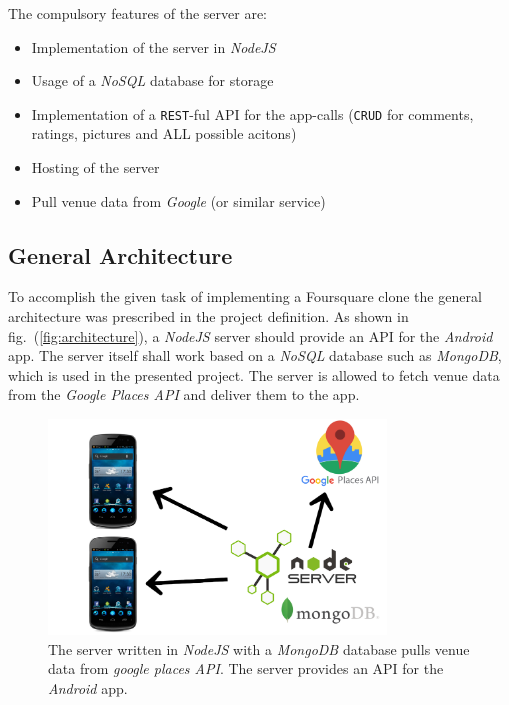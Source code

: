 The compulsory features of the server are:
\begin{itemize}
	\item Implementation of the server in \textit{NodeJS}
	\item Usage of a \textit{NoSQL} database for storage
	\item Implementation of a \texttt{REST}-ful API for the app-calls (\texttt{CRUD} for comments, ratings, pictures and ALL possible acitons)
	\item Hosting of the server
	\item Pull venue data from \textit{Google} (or similar service)	
\end{itemize}


\subsection{General Architecture}
\label{subsec:general_architecture}
To accomplish the given task of implementing a Foursquare clone the general architecture was prescribed in the project definition. As shown in fig.\ (\ref{fig:architecture}), a \textit{NodeJS} server should provide an API for the \textit{Android} app. The server itself shall work based on a \textit{NoSQL} database such as \textit{MongoDB}, which is used in the presented project. The server is allowed to fetch venue data from the \textit{Google Places API} and deliver them to the app. 

\begin{figure}[htbp]
	\includegraphics[width=0.8\textwidth]{images/architecture.png}
	\centering
	\caption[Project architecture]{The server written in \textit{NodeJS} with a \textit{MongoDB} database pulls venue data from \textit{google places API}. The server provides an API for the \textit{Android} app.\footnotemark}
	\label{fig:archtecture}
\end{figure} 

